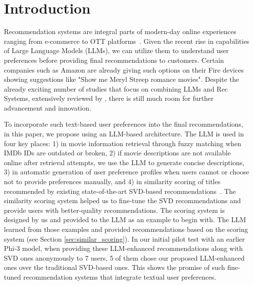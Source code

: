 \documentclass[sigconf]{acmart}
\newcommand{\changeAD}[1]{\textcolor{red}{AD: #1}}
\begin{document}

\maketitle
\section{Introduction}
Recommendation systems are integral parts of modern-day online experiences ranging from e-commerce to OTT platforms~\cite{aggarwal2016introduction,chiang2024recommender,roy2022systematic}. Given the recent rise in capabilities of Large Language Models (LLMs), we can utilize them to understand user preferences before providing final recommendations to customers. Certain companies such as Amazon are already giving such options on their Fire devices showing suggestions like "Show me Meryl Streep romance movies". Despite the already exciting number of studies that focus on combining LLMs and Rec Systems, extensively reviewed by \cite{wu2024survey}, there is still much room for further advancement and innovation.

To incorporate such text-based user preferences into the final recommendations, in this paper, we propose using an LLM-based architecture. The LLM is used in four key places: 1) in movie information retrieval through fuzzy matching when IMDb IDs are outdated or broken, 2) if movie descriptions are not available online after retrieval attempts, we use the LLM to generate concise descriptions, 3) in automatic generation of user preference profiles when users cannot or choose not to provide preferences manually, and 4) in similarity scoring of titles recommended by existing state-of-the-art SVD-based recommendations~\cite{koren2009matrix}. The similarity scoring system helped us to fine-tune the SVD recommendations and provide users with better-quality recommendations. The scoring system is designed by us and provided to the LLM as an example to begin with. The LLM learned from those examples and provided recommendations based on the scoring system (see Section \ref{sec:similar_scoring}). In our initial pilot test with an earlier Phi-3 model, when providing these LLM-enhanced recommendations along with SVD ones anonymously to 7 users, 5 of them chose our proposed LLM-enhanced ones over the traditional SVD-based ones. This shows the promise of such fine-tuned recommendation systems that integrate textual user preferences.  
\end{document}
